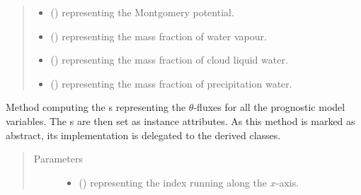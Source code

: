 \documentclass[letterpaper,10pt,english]{sphinxmanual}
\begin{document}
\begin{fulllineitems}
\begin{fulllineitems}
\begin{quote}
\begin{description}
\begin{itemize}
\item {} 
 () \textendash{}  representing the Montgomery potential.

\item {} 
 () \textendash{}  representing the mass fraction of water vapour.

\item {} 
 () \textendash{}  representing the mass fraction of cloud liquid water.

\item {} 
 () \textendash{}  representing the mass fraction of precipitation water.

\end{itemize}

\end{description}\end{quote}

\end{fulllineitems}


\begin{fulllineitems}
\label{\detokenize{api:tasmania.dycore.flux_isentropic_nonconservative.FluxIsentropicNonconservative._compute_vertical_fluxes}}
Method computing the s representing the \(\theta\)-fluxes for all the
prognostic model variables. The s are then set as instance attributes.
As this method is marked as abstract, its implementation is delegated to the derived classes.
\begin{quote}\begin{description}
\item[{Parameters}] \leavevmode\begin{itemize}
\item {} 
 () \textendash{}  representing the index running along the \(x\)-axis.


\end{itemize}
\end{description}
\end{quote}
\end{fulllineitems}
\end{fulllineitems}
\end{document}
